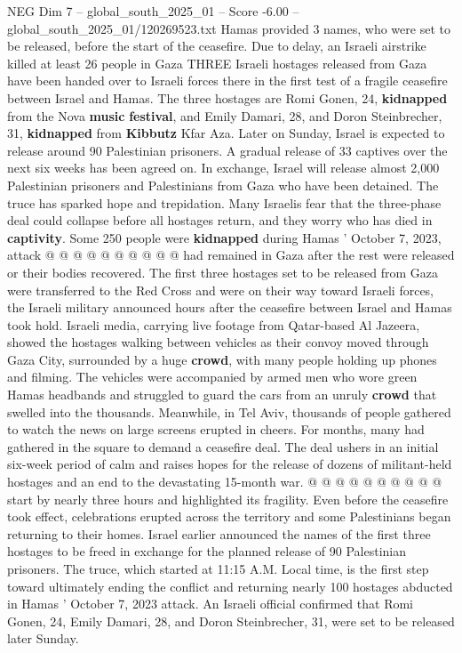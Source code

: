 \begin{textsample}{NEG Dim 7 – global\_south\_2025\_01 – Score -6.00 – global\_south\_2025\_01/120269523.txt}  \label{ex:f7_neg_199}
Hamas provided 3 names, who were set to be released, before the start of the ceasefire.
Due to delay, an Israeli airstrike killed at least 26 people in Gaza THREE Israeli hostages released from Gaza have been handed over to Israeli forces there in the first test of a fragile ceasefire between Israel and Hamas.
The three hostages are Romi Gonen, 24, \textbf{kidnapped} from the Nova \textbf{music} \textbf{festival}, and Emily Damari, 28, and Doron Steinbrecher, 31, \textbf{kidnapped} from \textbf{Kibbutz} Kfar Aza.
Later on Sunday, Israel is expected to release around 90 Palestinian prisoners.
A gradual release of 33 captives over the next six weeks has been agreed on.
In exchange, Israel will release almost 2,000 Palestinian prisoners and Palestinians from Gaza who have been detained.
The truce has sparked hope and trepidation.
Many Israelis fear that the three-phase deal could collapse before all hostages return, and they worry who has died in \textbf{captivity}.
Some 250 people were \textbf{kidnapped} during Hamas ' October 7, 2023, attack @ @ @ @ @ @ @ @ @ @ had remained in Gaza after the rest were released or their bodies recovered.
The first three hostages set to be released from Gaza were transferred to the Red Cross and were on their way toward Israeli forces, the Israeli military announced hours after the ceasefire between Israel and Hamas took hold.
Israeli media, carrying live footage from Qatar-based Al Jazeera, showed the hostages walking between vehicles as their convoy moved through Gaza City, surrounded by a huge \textbf{crowd}, with many people holding up phones and filming.
The vehicles were accompanied by armed men who wore green Hamas headbands and struggled to guard the cars from an unruly \textbf{crowd} that swelled into the thousands.
Meanwhile, in Tel Aviv, thousands of people gathered to watch the news on large screens erupted in cheers.
For months, many had gathered in the square to demand a ceasefire deal.
The deal ushers in an initial six-week period of calm and raises hopes for the release of dozens of militant-held hostages and an end to the devastating 15-month war. @ @ @ @ @ @ @ @ @ @ start by nearly three hours and highlighted its fragility.
Even before the ceasefire took effect, celebrations erupted across the territory and some Palestinians began returning to their homes.
Israel earlier announced the names of the first three hostages to be freed in exchange for the planned release of 90 Palestinian prisoners.
The truce, which started at 11:15 A.M.
Local time, is the first step toward ultimately ending the conflict and returning nearly 100 hostages abducted in Hamas ' October 7, 2023 attack.
An Israeli official confirmed that Romi Gonen, 24, Emily Damari, 28, and Doron Steinbrecher, 31, were set to be released later Sunday.

\end{textsample}
